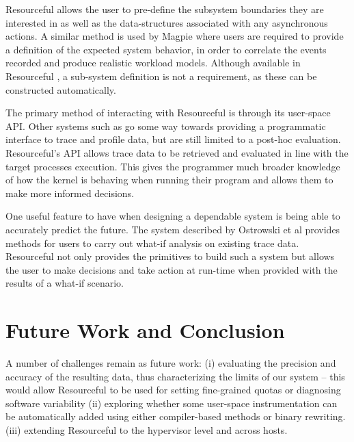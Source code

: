 \documentclass[letterpaper,twocolumn,10pt]{article}
\newcommand{\pname}{Resourceful}
\begin{document}
\pname{ } allows the user to pre-define the subsystem boundaries they are
interested in as well as the data-structures associated with any asynchronous
actions. A similar method is used by Magpie \cite{magpieosdi} where users are
required to provide a definition of the expected system behavior, in order to
correlate the events recorded and produce realistic workload models. Although
available in \pname{ }, a sub-system definition is not a requirement, as these
can be constructed automatically. 

The primary method of interacting with \pname{ } is through its user-space API.
Other systems such as \cite{fay} go some way towards providing a programmatic
interface to trace and profile data, but are still limited to a post-hoc
evaluation. \pname{}'s API allows trace data to be retrieved and evaluated in
line with the target processes execution. This gives the programmer much
broader knowledge of how the kernel is behaving when running their program and allows
them to make more informed decisions.

One useful feature to have when designing a dependable system is being able to
accurately predict the future. The system described by Ostrowski et al
\cite{ostrowski} provides methods for users to carry out what-if analysis on
existing trace data. \pname{ } not only provides the primitives to build such a
system but allows the user to make decisions and take action at run-time when
provided with the results of a what-if scenario.




\section{Future Work and Conclusion} 
A number of challenges remain as future work: (i) evaluating the precision and
accuracy of the resulting data, thus characterizing the limits of our system -- this
would allow \pname{ }to be used for setting fine-grained quotas or diagnosing
software variability (ii) exploring whether some user-space instrumentation can
be automatically added using either compiler-based methods or binary rewriting.
(iii) extending \pname{ } to the hypervisor level and across hosts.
\end{document}
